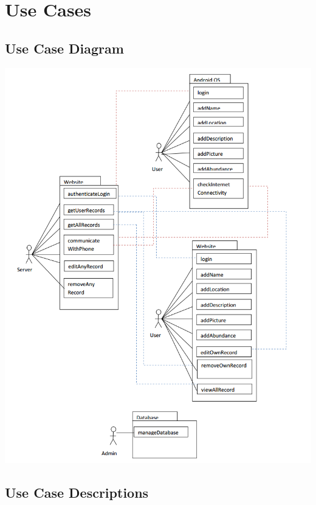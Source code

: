 \documentclass[11pt, titlepage]{article}
\begin{document}
	\section{Use Cases}
		\subsection{Use Case Diagram}
			\includegraphics[scale=0.8]{res/UseCaseDiagram.png}
		\subsection{Use Case Descriptions}
		
\end{document}
